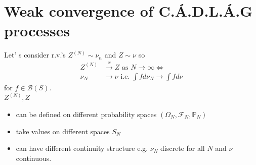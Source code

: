 \documentclass{article}
\begin{document}
\section{Weak convergence of C.\'A.D.L.\'A.G processes}
Let' s consider r.v.'s $Z^{(N)}\sim \nu_n$ and $Z \sim \nu$ so 
\begin{equation*}
	\begin{split}
		Z^{(N)} &\xrightarrow{x}  Z \text{ as } N \rightarrow \infty  \iff   \\
		\nu_N &\rightarrow \nu  \text{ i.e.   } \int f d \nu_N \rightarrow \int f d\nu
	\end{split}    
\end{equation*}
for $f \in \mathcal{B}(S)$. \\
$Z^{(N)}, Z$
\begin{itemize}
	\item can be defined on different probability spaces $(\Omega_N, \mathcal{F}_N, \mathbb{P}_N)$  
	\item take values on different spaces $S_N$
	\item can have different continuity structure e.g. $\nu_N$ discrete for all $N$ and $\nu$ continuous. 
\end{itemize}
\end{document}
